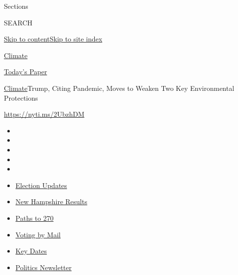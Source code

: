 Sections

SEARCH

\protect\hyperlink{site-content}{Skip to
content}\protect\hyperlink{site-index}{Skip to site index}

\href{https://www.nytimes3xbfgragh.onion/section/climate}{Climate}

\href{https://myaccount.nytimes3xbfgragh.onion/auth/login?response_type=cookie\&client_id=vi}{}

\href{https://www.nytimes3xbfgragh.onion/section/todayspaper}{Today's
Paper}

\href{/section/climate}{Climate}\textbar{}Trump, Citing Pandemic, Moves
to Weaken Two Key Environmental Protections

\url{https://nyti.ms/2UbzhDM}

\begin{itemize}
\item
\item
\item
\item
\item
\end{itemize}

\begin{itemize}
\item
  \href{https://www.nytimes3xbfgragh.onion/live/2020/09/09/us/trump-vs-biden?action=click\&pgtype=Article\&state=default\&region=TOP_BANNER\&context=storylines_menu}{Election
  Updates}
\item
  \href{https://www.nytimes3xbfgragh.onion/interactive/2020/09/08/us/elections/results-new-hampshire-primary-elections.html?action=click\&pgtype=Article\&state=default\&region=TOP_BANNER\&context=storylines_menu}{New
  Hampshire Results}
\item
  \href{https://www.nytimes3xbfgragh.onion/interactive/2020/us/elections/election-states-biden-trump.html?action=click\&pgtype=Article\&state=default\&region=TOP_BANNER\&context=storylines_menu}{Paths
  to 270}
\item
  \href{https://www.nytimes3xbfgragh.onion/interactive/2020/08/31/us/politics/vote-by-mail-deadlines.html?action=click\&pgtype=Article\&state=default\&region=TOP_BANNER\&context=storylines_menu}{Voting
  by Mail}
\item
  \href{https://www.nytimes3xbfgragh.onion/interactive/2019/us/elections/2020-presidential-election-calendar.html?action=click\&pgtype=Article\&state=default\&region=TOP_BANNER\&context=storylines_menu}{Key
  Dates}
\item
  \href{https://www.nytimes3xbfgragh.onion/newsletters/politics?action=click\&pgtype=Article\&state=default\&region=TOP_BANNER\&context=storylines_menu}{Politics
  Newsletter}
\end{itemize}

